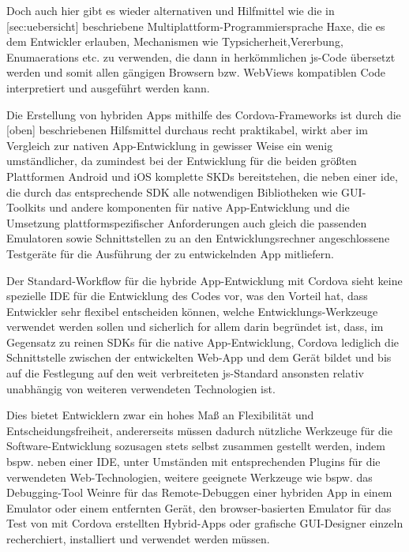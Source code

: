 Doch auch hier gibt es wieder alternativen und Hilfmittel wie \zB die in [sec:uebersicht] beschriebene Multiplattform-Programmiersprache Haxe, die es dem Entwickler erlauben, Mechanismen wie Typsicherheit,Vererbung, Enumaerations etc. zu verwenden, die dann in herkömmlichen \gls{js}-Code übersetzt werden und somit allen gängigen Browsern bzw. WebViews kompatiblen Code interpretiert und ausgeführt werden kann.

Die Erstellung von hybriden Apps mithilfe des Cordova-Frameworks ist durch die [oben] beschriebenen Hilfsmittel durchaus recht praktikabel, wirkt aber im Vergleich zur nativen App-Entwicklung in gewisser Weise ein wenig umständlicher, da zumindest bei der Entwicklung für die beiden größten Plattformen Android und iOS komplette SKDs bereitstehen, die neben einer ide, die durch das entsprechende SDK alle notwendigen Bibliotheken wie GUI-Toolkits und andere komponenten für native App-Entwicklung und die Umsetzung plattformspezifischer Anforderungen auch gleich die passenden Emulatoren sowie Schnittstellen zu an den Entwicklungsrechner angeschlossene Testgeräte für die Ausführung der zu entwickelnden App mitliefern.


Der Standard-Workflow für die hybride App-Entwicklung mit Cordova sieht keine spezielle IDE für die Entwicklung des Codes vor, was den Vorteil hat, dass Entwickler sehr flexibel entscheiden können, welche Entwicklungs-Werkzeuge verwendet werden sollen und sicherlich for allem darin begründet ist, dass, im Gegensatz zu reinen SDKs für die native App-Entwicklung, Cordova lediglich die Schnittstelle zwischen der entwickelten Web-App und dem Gerät bildet und bis auf die Festlegung auf den weit verbreiteten \gls{js}-Standard ansonsten relativ unabhängig von weiteren verwendeten Technologien ist.

Dies bietet Entwicklern zwar ein hohes Maß an Flexibilität und Entscheidungsfreiheit, andererseits müssen dadurch nützliche Werkzeuge für die Software-Entwicklung sozusagen stets selbst zusammen gestellt werden, indem bspw. neben einer IDE, unter Umständen mit entsprechenden Plugins für die verwendeten Web-Technologien, weitere geeignete Werkzeuge wie bspw. das Debugging-Tool Weinre für das Remote-Debuggen einer hybriden App in einem Emulator oder einem entfernten Gerät, den browser-basierten Emulator für das Test von mit Cordova erstellten Hybrid-Apps oder grafische GUI-Designer einzeln recherchiert, installiert und verwendet werden müssen. 

